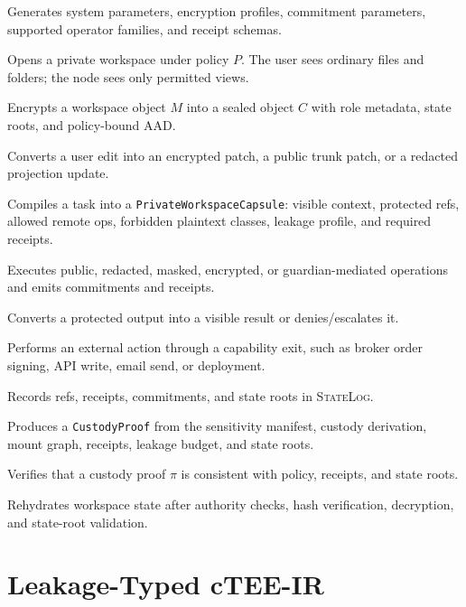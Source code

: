 \documentclass[11pt]{article}
\newcommand{\roletext}[1]{\textnormal{\textsc{#1}}\xspace}
\newcommand{\node}{\ifmmode\mathsf{Node}\else\roletext{Node}\fi}
\newcommand{\user}{\ifmmode\mathsf{User}\else\roletext{User}\fi}
\newcommand{\ag}{\ifmmode\mathsf{StateLog}\else\roletext{StateLog}\fi}
\newcommand{\code}[1]{\texttt{#1}}
\begin{document}
\begin{description}[leftmargin=1.8em]
\item[\(\mathsf{Setup}(1^\lambda)\).] Generates system parameters, encryption
profiles, commitment parameters, supported operator families, and receipt
schemas.
\item[\(\mathsf{Open}(\user, P)\).] Opens a private workspace under policy
\(P\). The user sees ordinary files and folders; the node sees only permitted
views.
\item[\(\mathsf{Seal}(W, M, role)\).] Encrypts a workspace object \(M\) into a
sealed object \(C\) with role metadata, state roots, and policy-bound AAD.
\item[\(\mathsf{Patch}(W, \Delta)\).] Converts a user edit into an encrypted
patch, a public trunk patch, or a redacted projection update.
\item[\(\mathsf{Compile}(task, P)\).] Compiles a task into a
\code{PrivateWorkspaceCapsule}: visible context, protected refs, allowed remote
ops, forbidden plaintext classes, leakage profile, and required receipts.
\item[\(\mathsf{Eval}(\node, capsule)\).] Executes public, redacted, masked,
encrypted, or guardian-mediated operations and emits commitments and receipts.
\item[\(\mathsf{Declassify}(Y, P, grant)\).] Converts a protected output into a
visible result or denies/escalates it.
\item[\(\mathsf{Exit}(a, P, grant)\).] Performs an external action through a
capability exit, such as broker order signing, API write, email send, or
deployment.
\item[\(\mathsf{Commit}(R)\).] Records refs, receipts, commitments, and state
roots in \ag.
\item[\(\mathsf{ProveCustody}(trace, P)\).] Produces a
\code{CustodyProof} from the sensitivity manifest, custody derivation, mount
graph, receipts, leakage budget, and state roots.
\item[\(\mathsf{VerifyCustody}(\pi, P)\).] Verifies that a custody proof
\(\pi\) is consistent with policy, receipts, and state roots.
\item[\(\mathsf{Restore}(archive, P)\).] Rehydrates workspace state after
authority checks, hash verification, decryption, and state-root validation.
\end{description}

\section{Leakage-Typed cTEE-IR}
\end{document}
